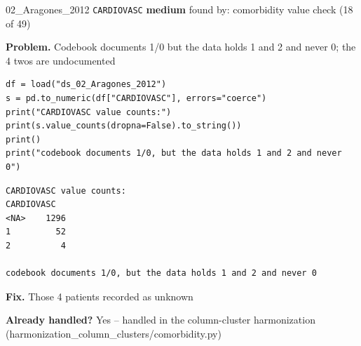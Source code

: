 \documentclass[9pt, t, handout]{beamer}
\newcommand{\ans}[1]{\textcolor{structure.fg}{#1}}
\begin{document}
\begin{frame}[fragile]{02\_Aragones\_2012 \quad \texttt{CARDIOVASC}}
  {\scriptsize\textcolor{blue!55!black}{\textbf{medium}} \quad
   found by: comorbidity value check \quad (18 of 49)}
  \vspace{3pt}

  {\footnotesize \textbf{Problem.} Codebook documents 1/0 but the data holds 1 and 2 and never 0; the 4 twos are undocumented}
  \vspace{4pt}

  \begin{Verbatim}[fontsize=\tiny, frame=single, framesep=2pt, label=\tiny reproduce]
df = load("ds_02_Aragones_2012")
s = pd.to_numeric(df["CARDIOVASC"], errors="coerce")
print("CARDIOVASC value counts:")
print(s.value_counts(dropna=False).to_string())
print()
print("codebook documents 1/0, but the data holds 1 and 2 and never 0")
  \end{Verbatim}
  \begin{Verbatim}[fontsize=\tiny, frame=single, framesep=2pt, label=\tiny output]
CARDIOVASC value counts:
CARDIOVASC
<NA>    1296
1         52
2          4

codebook documents 1/0, but the data holds 1 and 2 and never 0
  \end{Verbatim}
  \vspace{2pt}

  {\footnotesize \textbf{Fix.} Those 4 patients recorded as unknown}
  \vspace{2pt}

  {\footnotesize \textbf{Already handled?} \ans{Yes} -- handled in the column-cluster harmonization
   (harmonization\_column\_clusters/comorbidity.py)}
\end{frame}
\end{document}
